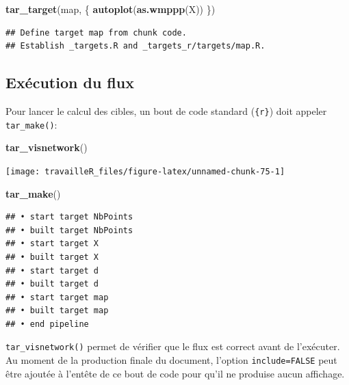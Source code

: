 \documentclass[
  12pt,
  french,
  a4paper,
  extrafontsizes,onecolumn,openright
  ]{memoir}
\newenvironment{Shaded}{\begin{snugshade}}{\end{snugshade}}
\newcommand{\KeywordTok}[1]{\textcolor[rgb]{0.13,0.29,0.53}{\textbf{#1}}}
\newcommand{\NormalTok}[1]{#1}
\begin{document}
\scriptsize

\begin{Shaded}
\begin{Highlighting}[]
\KeywordTok{tar_target}\NormalTok{(map, \{}
    \KeywordTok{autoplot}\NormalTok{(}\KeywordTok{as.wmppp}\NormalTok{(X))}
\NormalTok{\})}
\end{Highlighting}
\end{Shaded}

\begin{verbatim}
## Define target map from chunk code.
## Establish _targets.R and _targets_r/targets/map.R.
\end{verbatim}

\normalsize

\hypertarget{exuxe9cution-du-flux}{%
\subsection{Exécution du flux}\label{exuxe9cution-du-flux}}

Pour lancer le calcul des cibles, un bout de code standard (\texttt{\{r\}}) doit appeler \texttt{tar\_make()}:

\scriptsize

\begin{Shaded}
\begin{Highlighting}[]
\KeywordTok{tar_visnetwork}\NormalTok{()}
\end{Highlighting}
\end{Shaded}

\begin{center}\texttt{[image: travailleR\_files/figure-latex/unnamed-chunk-75-1]} \end{center}

\begin{Shaded}
\begin{Highlighting}[]
\KeywordTok{tar_make}\NormalTok{()}
\end{Highlighting}
\end{Shaded}

\begin{verbatim}
## • start target NbPoints
## • built target NbPoints
## • start target X
## • built target X
## • start target d
## • built target d
## • start target map
## • built target map
## • end pipeline
\end{verbatim}

\normalsize

\texttt{tar\_visnetwork()} permet de vérifier que le flux est correct avant de l'exécuter.
Au moment de la production finale du document, l'option \texttt{include=FALSE} peut être ajoutée à l'entête de ce bout de code pour qu'il ne produise aucun affichage.
\end{document}
